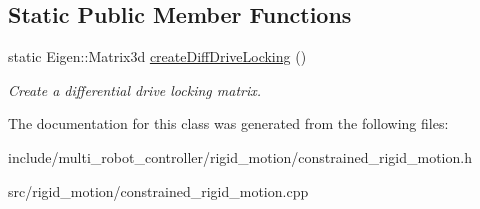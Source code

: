 \subsection*{Static Public Member Functions}
\begin{DoxyCompactItemize}
\item 
static Eigen\+::\+Matrix3d \hyperlink{group__RigidMotion_ga8f1f65bf1494ab1ddc8fe3d2af5353a4}{create\+Diff\+Drive\+Locking} ()
\begin{DoxyCompactList}\small\item\em Create a differential drive locking matrix. \end{DoxyCompactList}\end{DoxyCompactItemize}


The documentation for this class was generated from the following files\+:\begin{DoxyCompactItemize}
\item 
include/multi\+\_\+robot\+\_\+controller/rigid\+\_\+motion/constrained\+\_\+rigid\+\_\+motion.\+h\item 
src/rigid\+\_\+motion/constrained\+\_\+rigid\+\_\+motion.\+cpp\end{DoxyCompactItemize}
